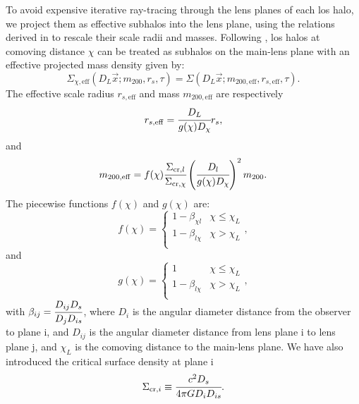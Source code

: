 To avoid expensive iterative ray-tracing through the lens planes of each \gls*{los} halo, we project them as effective subhalos into the lens plane, using the relations derived in \cite{CaganSengul:2020nat} to rescale their scale radii and masses. Following \cite{CaganSengul:2020nat}, \gls*{los} halos at comoving distance $\chi$ can be treated as subhalos on the main-lens plane with an effective projected mass density given by:
\begin{equation}
    \Sigma_{\chi, \mathrm{eff}}(D_L\vec{x};m_{200},r_s,\tau)= \Sigma(D_L\vec{x};m_{200,\mathrm{eff}},r_{s,\mathrm{eff}},\tau).
\end{equation}
The effective scale radius $r_{s,\mathrm{eff}}$ and mass $m_{200,\mathrm{eff}}$ are respectively
\begin{equation}
    r_{s,\mathrm{eff}}=\cfrac{D_L}{g(\chi)D_\chi}r_s,
\end{equation}
and
\begin{equation}
    m_{200,\mathrm{eff}}=f(\chi)\cfrac{\Sigma_{\mathrm{cr}, l}}{\Sigma_{\mathrm{cr}, \chi}}\left(\cfrac{D_l}{g(\chi)D_\chi}\right)^2m_{200}.
\end{equation}
The piecewise functions $f(\chi)$ and $g(\chi)$ are:
\begin{equation}
    f(\chi)= \begin{cases}
            1-\beta_{\chi l} & \chi \leq \chi_L \\
            1-\beta_{l\chi}  & \chi > \chi_L \\
            \end{cases},
\end{equation}
and
\begin{equation}
    g(\chi)= \begin{cases}
            1 & \chi \leq \chi_L \\
            1-\beta_{l\chi}  & \chi > \chi_L \\
            \end{cases},
\end{equation}
with $\beta_{ij}=\cfrac{D_{ij}D_s}{D_jD_{is}}$, where $D_i$ is the angular diameter distance from the observer to plane i, and $D_{ij}$ is the angular diameter distance from lens plane i to lens plane j, and $\chi_L$ is the comoving distance to the main-lens plane.
We have also introduced the critical surface density at plane i
\begin{equation}
    \Sigma_{\mathrm{cr}, i}\equiv \cfrac{c^2D_s}{4\pi G D_i D_{is}}.
\end{equation}

